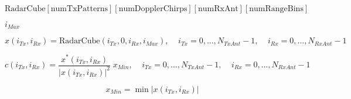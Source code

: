 \documentclass{article}
\begin{document}
\[ \mbox{RadarCube}[\mbox{numTxPatterns}][\mbox{numDopplerChirps}][\mbox{numRxAnt}][\mbox{numRangeBins}] \]
\pagebreak

$i_{Max}$
\pagebreak

\[ x(i_{Tx},i_{Rx}) = \mbox{RadarCube}(i_{Tx},0,i_{Rx},i_{Max}), \;\;\;\; i_{Tx}=0,...,N_{TxAnt}-1, \;\;\;\; i_{Rx}=0,...,N_{RxAnt}-1 \]
\pagebreak

\[ c(i_{Tx},i_{Rx}) = \frac{x^*(i_{Tx},i_{Rx})}{|x(i_{Tx},i_{Rx})|^2}\;x_{Min}, \;\;\;\; i_{Tx}=0,...,N_{TxAnt}-1, \;\;\;\; i_{Rx}=0,...,N_{RxAnt}-1 \]
\pagebreak

\[ x_{Min} = \min{|x(i_{Tx},i_{Rx})|} \]
\pagebreak
\end{document}
